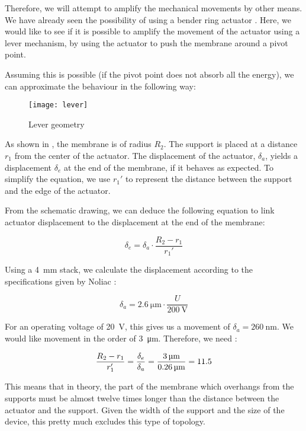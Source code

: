 Therefore, we will attempt to amplify the mechanical movements by other means.
We have already seen the possibility of using a bender ring actuator
\cite{wiesendanger2001}. Here, we would like to see if it is possible to amplify
the movement of the actuator using a lever mechanism, by using the actuator to
push the membrane around a pivot point.

Assuming this is possible (if the pivot point does not absorb all the energy),
we can approximate the behaviour in the following way:

\begin{figure}[h]
  \begin{center}
    \texttt{[image: lever]}
  \end{center}
  \caption{Lever geometry}
  \label{fig:lever}
\end{figure}

As shown in , the membrane is of radius $R_2$. The support is
placed at a distance $r_1$ from the center of the actuator.  The displacement of
the actuator, $\delta_a$, yields a displacement $\delta_e$ at the end of the
membrane, if it behaves as expected. To simplify the equation, we use $r_1'$ to
represent the distance between the support and the edge of the actuator.

From the schematic drawing, we can deduce the following equation to link
actuator displacement to the displacement at the end of the membrane:

\begin{equation}
  \delta_e = \delta_a \cdot \frac{R_2-r_1}{r_1'}
  \label{eq:displacement}
\end{equation}

Using a \SI{4}{\milli\metre} stack, we calculate the displacement according to
the specifications given by Noliac :

\begin{equation}
  \delta_a = \SI{2.6}{\micro\metre} \cdot \frac{U}{\SI{200}{\volt}}
  \label{eq:delta-a}
\end{equation}

For an operating voltage of \SI{20}{\volt}, this gives us a movement of
$\delta_a = \SI{260}{\nano\metre}$. We would like movement in the order of
\SI{3}{\micro\metre}. Therefore, we need :

\begin{equation}
  \frac{R_2 - r_1}{r_1'} = \frac{\delta_e}{\delta_a} = 
  {\SI{3}{\micro\metre} \over \SI{0.26}{\micro\metre}} = 11.5
  \label{eq:11-5}
\end{equation}

This means that in theory, the part of the membrane which overhangs from the
supports must be almost twelve times longer than the distance between the
actuator and the support. Given the width of the support and the size of the
device, this pretty much excludes this type of topology.
